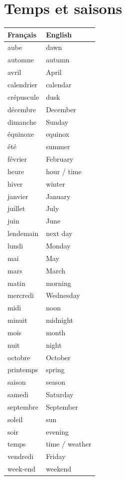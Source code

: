 \documentclass[12pt,a4paper]{article}
\begin{document}
\section{Temps et saisons}
\begin{longtable}{p{4cm} p{6cm}}
\toprule
\textbf{Français} & \textbf{English} \\
\midrule
aube & dawn \\
automne & autumn \\
avril & April \\
calendrier & calendar \\
crépuscule & dusk \\
décembre & December \\
dimanche & Sunday \\
équinoxe & equinox \\
été & summer \\
février & February \\
heure & hour / time \\
hiver & winter \\
janvier & January \\
juillet & July \\
juin & June \\
lendemain & next day \\
lundi & Monday \\
mai & May \\
mars & March \\
matin & morning \\
mercredi & Wednesday \\
midi & noon \\
minuit & midnight \\
mois & month \\
nuit & night \\
octobre & October \\
printemps & spring \\
saison & season \\
samedi & Saturday \\
septembre & September \\
soleil & sun \\
soir & evening \\
temps & time / weather \\
vendredi & Friday \\
week-end & weekend \\
\bottomrule
\end{longtable}

\newpage
\end{document}
